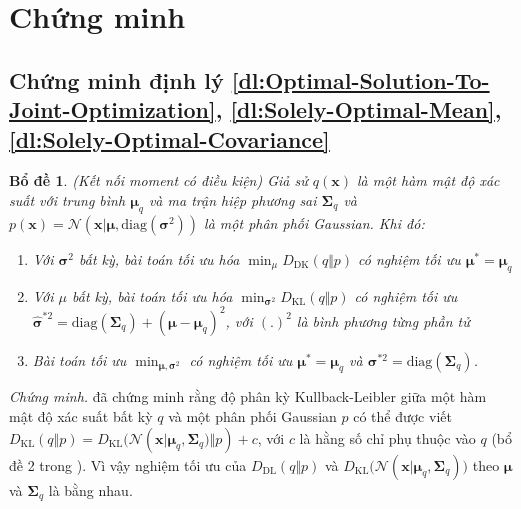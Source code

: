 \documentclass[14pt, a4paper]{article}
\numberwithin{equation}{section}
\numberwithin{figure}{section}
\newtheorem{bd}{Bổ đề}
\numberwithin{dl}{section}
\numberwithin{md}{section}
\numberwithin{bd}{section}
\numberwithin{dn}{section}
\numberwithin{hq}{section}
\begin{document}
    \newpage
    \printbibliography[title={TÀI LIỆU THAM KHẢO}]

    \newpage

    \appendix

    \section{Chứng minh} \label{Appen:Section:Proof}

    \subsection{Chứng minh định lý \ref{dl:Optimal-Solution-To-Joint-Optimization}, \ref{dl:Solely-Optimal-Mean}, \ref{dl:Solely-Optimal-Covariance}}

    \begin{bd} \label{bd:Conditioned-Moment-Matching} (Kết nối moment có điều kiện) Giả sử $q(\boldsymbol{x})$ là một hàm mật độ xác suất với trung bình $\boldsymbol{\mu}_q$ và ma trận hiệp phương sai $\boldsymbol{\Sigma}_q$ và $p(\boldsymbol{x})=\mathcal{N}(\boldsymbol{x} \vert \boldsymbol{\mu}, \mathrm{diag}(\boldsymbol{\sigma}^2))$ là một phân phối Gaussian. Khi đó:

    \begin{enumerate}
        \item Với $\boldsymbol{\sigma}^2$ bất kỳ, bài toán tối ưu hóa $\displaystyle\min_{\mu} D_{\mathrm{DK}} (q \Vert p)$ có nghiệm tối ưu $\boldsymbol{\mu}^{\ast}=\boldsymbol{\mu}_q$
        \item Với $\mu$ bất kỳ, bài toán tối ưu hóa $\displaystyle\min_{\boldsymbol{\sigma}^2} D_{\mathrm{KL}}(q \Vert p)$ có nghiệm tối ưu $\hat{\boldsymbol{\sigma}}^{\ast 2}=\mathrm{diag}(\boldsymbol{\Sigma}_q) + (\boldsymbol{\mu} - \boldsymbol{\mu}_q)^2$, với $(.)^2$ là bình phương từng phần tử
        \item Bài toán tối ưu $\displaystyle\min_{\boldsymbol{\mu}, \boldsymbol{\sigma}^2}$ có nghiệm tối ưu $\boldsymbol{\mu}^{\ast}=\boldsymbol{\mu}_q$ và $\boldsymbol{\sigma}^{\ast 2} = \mathrm{diag} (\boldsymbol{\Sigma}_q)$.
    \end{enumerate}

    \end{bd}

    \textit{Chứng minh.} \cite{bao2021analytic} đã chứng minh rằng độ phân kỳ Kullback-Leibler giữa một hàm mật độ xác suất bất kỳ $q$ và một phân phối Gaussian $p$ có thể được viết $D_{\mathrm{KL}}(q \Vert p)=D_{\mathrm{KL}}\big(\mathcal{N}(\boldsymbol{x} \vert \boldsymbol{\mu}_q, \boldsymbol{\Sigma}_q \big) \Vert p) + c$, với $c$ là hằng số chỉ phụ thuộc vào $q$ (bổ đề 2 trong \cite{bao2021analytic}).
    Vì vậy nghiệm tối ưu của $D_{\mathrm{DL}} (q \Vert p)$ và $D_{\mathrm{KL}} \big( \mathcal{N} (\boldsymbol{x} \vert \boldsymbol{\mu}_q, \boldsymbol{\Sigma}_q) \big)$ theo $\boldsymbol{\mu}$ và $\boldsymbol{\Sigma}_q$ là bằng nhau.
\end{document}
